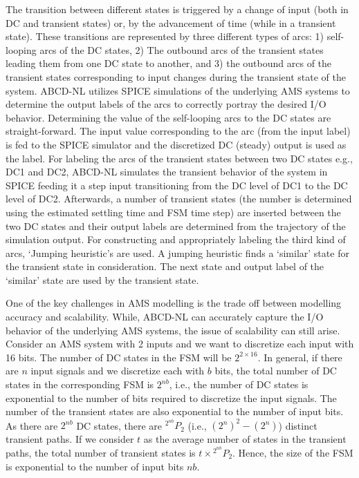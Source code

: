 \documentclass[a4paper]{article}
\newcommand*{\Perm}[2]{{}^{#1}\!P_{#2}}%
\begin{document}
The transition between different states is triggered by a change of input (both in DC and transient states) or, by the advancement of time (while in a transient state). These transitions are represented by three different types of arcs: 1) self-looping arcs of the DC states, 2) The outbound arcs of the transient states leading them from one DC state to another, and 3) the outbound arcs of the transient states corresponding to input changes during the transient state of the system. ABCD-NL utilizes SPICE simulations of the underlying AMS systems to determine the output labels of the arcs to correctly portray the desired I/O behavior.  Determining the value of the self-looping arcs to the DC states are straight-forward. The input value corresponding to the arc (from the input label) is fed to the SPICE simulator and the discretized DC (steady) output is used as the label. For labeling the arcs of the transient states between two DC states e.g., DC1 and DC2, ABCD-NL simulates the transient behavior of the system in SPICE feeding it a step input transitioning from the DC level of DC1 to the DC level of DC2. Afterwards, a number of transient states (the number is determined using the estimated settling time and FSM time step) are inserted between the two DC states and their output labels are determined from the trajectory of the simulation output. For constructing and appropriately labeling the third kind of arcs, `Jumping heuristic's are used. A jumping heuristic finds a `similar' state for the transient state in consideration. The next state and output label of the `similar' state are used by the transient state. 


One of the key challenges in AMS modelling is the trade off between modelling accuracy and  scalability. While, ABCD-NL can accurately capture the I/O behavior of the underlying AMS systems, the issue of  scalability can still arise. Consider an AMS system with 2 inputs and we want to discretize each input with 16 bits. The number of DC states in the FSM will be $2^{2 \times 16}$. In general, if there are $n$ input signals and we discretize each with $b$ bits, the total number of DC states in the corresponding FSM is $2^{nb}$, i.e., the number of DC states is exponential to the number of bits required to discretize the input signals. The number of the transient states are also exponential to the number of input bits. As there are $2^{nb}$ DC states, there are $\Perm{2^{nb}}{2}$ (i.e., $ (2^n)^2 - (2^n) $) distinct transient paths. If we consider $t$ as the average number of states in the transient paths, the total number of transient states is $ t \times \Perm{2^{nb}}{2} $. Hence, the size of the FSM is exponential to the number of  input bits $nb$. 
\end{document}
